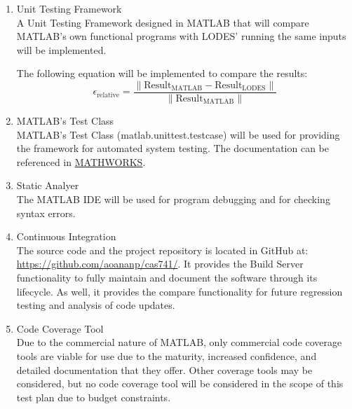 \documentclass[12pt, titlepage]{article}
\newcommand{\famname}{LODES} %
\newcommand{\famurl}{https://github.com/aoananp/cas741/}
\newcommand{\unittesturl}{https://www.mathworks.com/help/matlab/matlab_prog/author-class-based-unit-tests-
in-matlab.html}
\begin{document}
\begin{enumerate}
\item{Unit Testing Framework\\}
A Unit Testing Framework designed in MATLAB that will compare MATLAB's own functional programs
with \famname{}' running the same inputs will be implemented.

The following equation   will be implemented to
compare the results:
$$\epsilon_{\text{relative}} = \frac{\|\text{Result}_\text{MATLAB} - \text{Result}_\text{\famname{}}\|} {\| \text{Result}
_\text{MATLAB} \|} $$


\item{MATLAB's Test Class\\}
MATLAB's Test Class (matlab.unittest.testcase) will be used for providing the framework for automated
system testing. The documentation can be referenced in \href{\unittesturl}{MATHWORKS}.

\item{Static Analyer\\}  
The MATLAB IDE will be used for program debugging and
for checking syntax errors.

\item{Continuous Integration\\}
The source code and the project repository is located in GitHub at: \url{\famurl}.
It provides the Build Server functionality to fully maintain and document the software through its lifecycle.
As well, it provides the compare functionality for future regression testing and
analysis of code updates.   
  

\item{Code Coverage Tool\\}
Due to the commercial nature of MATLAB, only commercial code coverage tools are viable for use due to the 
maturity, increased confidence, and detailed documentation that they offer. Other coverage tools may be 
considered, but no code coverage tool will be considered in the scope of this
test plan due to budget constraints. 

\end{enumerate}
\end{document}
